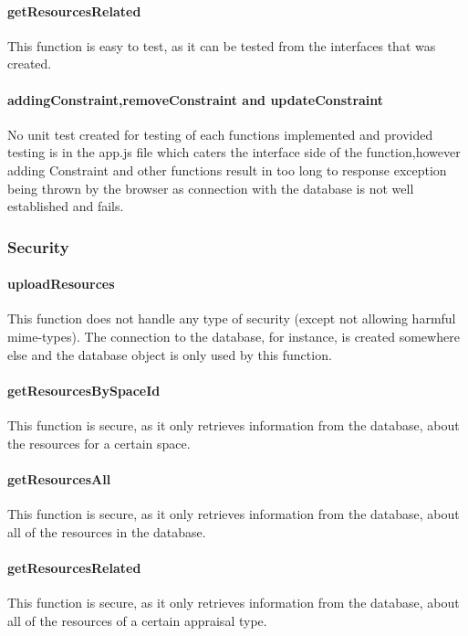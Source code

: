 \documentclass[a4paper]{article}
\begin{document}
\paragraph{getResourcesRelated}
This function is easy to test, as it can be tested from the interfaces that was created.

\paragraph{addingConstraint,removeConstraint and updateConstraint}
No unit test created for testing of each functions implemented and provided testing is in the app.js file which caters the interface side of the function,however adding Constraint and other functions result in too long to response exception being thrown by the browser as connection with the database is not well established and fails.

\subsubsection {Security}

\paragraph{uploadResources}
This function does not handle any type of security (except not allowing harmful mime-types). The connection to the database, for instance, is created somewhere else and the database object is only used by this function.

\paragraph{getResourcesBySpaceId}
This function is secure, as it only retrieves information from the database, about the resources for a certain space.

\paragraph{getResourcesAll}
This function is secure, as it only retrieves information from the database, about all of the resources in the database.

\paragraph{getResourcesRelated}
This function is secure, as it only retrieves information from the database, about all of the resources of a certain appraisal type.
\end{document}
